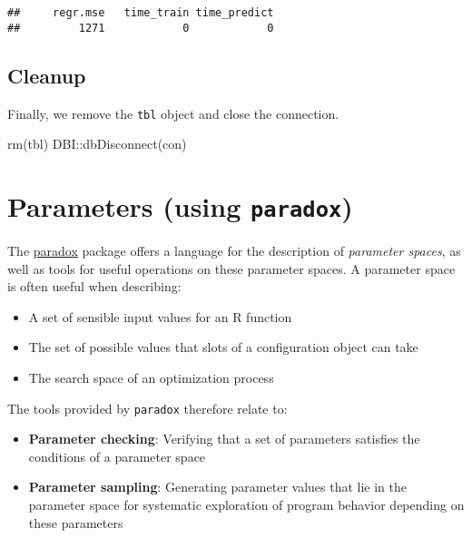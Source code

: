 \documentclass[
]{scrbook}
\newenvironment{Shaded}{\begin{snugshade}}{\end{snugshade}}
\newcommand{\FunctionTok}[1]{\textcolor[rgb]{0.00,0.00,0.00}{#1}}
\newcommand{\NormalTok}[1]{#1}
\newcommand{\SpecialCharTok}[1]{\textcolor[rgb]{0.00,0.00,0.00}{#1}}
\providecommand{\tightlist}{%
  \setlength{\itemsep}{0pt}\setlength{\parskip}{0pt}}
\renewenvironment{Shaded} {\begin{snugshade}\small} {\end{snugshade}}
\begin{document}
\begin{verbatim}
##     regr.mse   time_train time_predict 
##         1271            0            0
\end{verbatim}

\hypertarget{cleanup}{%
\subsection{Cleanup}\label{cleanup}}

Finally, we remove the \texttt{tbl} object and close the connection.

\begin{Shaded}
\begin{Highlighting}[]
\FunctionTok{rm}\NormalTok{(tbl)}
\NormalTok{DBI}\SpecialCharTok{::}\FunctionTok{dbDisconnect}\NormalTok{(con)}
\end{Highlighting}
\end{Shaded}

\hypertarget{paradox}{%
\section{\texorpdfstring{Parameters (using \texttt{paradox})}{Parameters (using paradox)}}\label{paradox}}

The \href{https://paradox.mlr-org.com}{paradox} package offers a language for the description of \emph{parameter spaces}, as well as tools for useful operations on these parameter spaces.
A parameter space is often useful when describing:

\begin{itemize}
\tightlist
\item
  A set of sensible input values for an R function
\item
  The set of possible values that slots of a configuration object can take
\item
  The search space of an optimization process
\end{itemize}

The tools provided by \texttt{paradox} therefore relate to:

\begin{itemize}
\tightlist
\item
  \textbf{Parameter checking}: Verifying that a set of parameters satisfies the conditions of a parameter space
\item
  \textbf{Parameter sampling}: Generating parameter values that lie in the parameter space for systematic exploration of program behavior depending on these parameters
\end{itemize}
\end{document}
